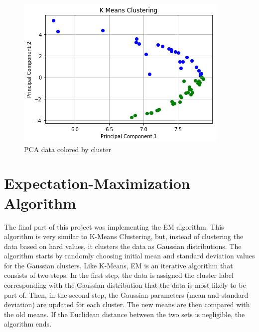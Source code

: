 \documentclass[12pt]{article}
\begin{document}
    \begin{figure}
    	\includegraphics[width=\linewidth]{Pictures/PCACluster.png}
    	\caption{PCA data colored by cluster}
    	\label{PCACluster}
    \end{figure}
    
    \section{Expectation-Maximization Algorithm}
    The final part of this project was implementing the EM algorithm. This algorithm is very similar to K-Means Clustering, but, instead of clustering the data based on hard values, it clusters the data as Gaussian distributions. The algorithm starts by randomly choosing initial mean and standard deviation values for the Gaussian clusters. Like K-Means, EM is an iterative algorithm that consists of two steps. In the first step, the data is assigned the cluster label corresponding with the Gaussian distribution that the data is most likely to be part of. Then, in the second step, the Gaussian parameters (mean and standard deviation) are updated for each cluster. The new means are then compared with the old means. If the Euclidean distance between the two sets is negligible, the algorithm ends.
\end{document}
